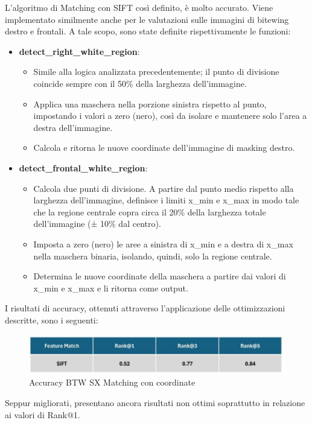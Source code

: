 \documentclass[12pt,a4paper,openright,twoside]{book}
\begin{document}
L'algoritmo di Matching con SIFT così definito, è molto accurato. Viene implementato similmente anche per le valutazioni sulle immagini di bitewing destro e frontali. A tale scopo, sono state definite rispettivamente le funzioni:
\begin{itemize}
\item \textbf{detect\_right\_white\_region}:
\begin{itemize}
\item Simile alla logica analizzata precedentemente; il punto di divisione coincide sempre con il 50\% della larghezza dell'immagine.
\item Applica una maschera nella porzione sinistra rispetto al punto, impostando i valori a zero (nero), così da isolare e mantenere solo l'area a destra dell'immagine.
\item Calcola e ritorna le nuove coordinate dell'immagine di masking destro.
\end{itemize}

\item \textbf{detect\_frontal\_white\_region}:
\begin{itemize}
\item Calcola due punti di divisione. A partire dal punto medio rispetto alla larghezza dell'immagine, definisce i limiti x\_min e x\_max in modo tale che la regione centrale copra circa il 20\% della larghezza totale dell'immagine (± 10\% dal centro).
\item Imposta a zero (nero) le aree a sinistra di x\_min e a destra di x\_max nella maschera binaria, isolando, quindi, solo la regione centrale.
\item Determina le nuove coordinate della maschera a partire dai valori di x\_min e x\_max e li ritorna come output.
\end{itemize}
\end{itemize}

I risultati di accuracy, ottenuti attraverso l'applicazione delle ottimizzazioni descritte, sono i seguenti:
\begin{figure}[H]
	\centering
	\includegraphics{figures/sx8.pdf}
    	\caption{Accuracy BTW SX Matching con coordinate}
	\label{fig:sx8}
\end{figure}
Seppur migliorati, presentano ancora risultati non ottimi soprattutto in relazione ai valori di Rank@1.
\end{document}
